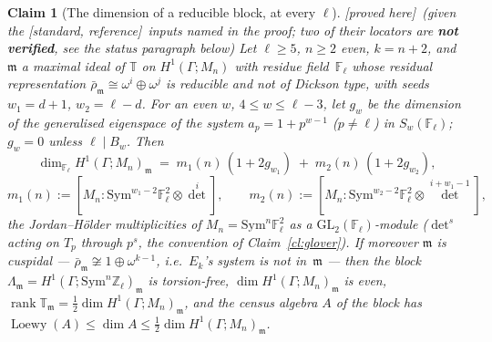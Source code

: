 \documentclass[11pt]{article}
\newtheorem{claim}[theorem]{Claim}
\theoremstyle{remark}
\newcommand{\F}{\mathbb{F}}
\newcommand{\Z}{\mathbb{Z}}
\newcommand{\GL}{\mathrm{GL}}
\newcommand{\Sym}{\mathrm{Sym}}
\newcommand{\Ga}{\Gamma}
\newcommand{\Fl}{\F_\ell}
\DeclareMathOperator{\rank}{rank}
\newcommand{\T}{\mathbb{T}}
\newcommand{\m}{\mathfrak{m}}
\newcommand{\Mn}{M_n}
\newcommand{\PROVED}{\textsf{[proved here]}}
\newcommand{\STD}{\textsf{[standard, reference]}}
\begin{document}
\begin{claim}[The dimension of a reducible block, at every $\ell$]\label{cl:dimformula}\PROVED\ (given the \STD\ inputs named in the proof; two of their
locators are \textbf{not verified}, see the status paragraph below)
Let $\ell\ge5$, $n\ge2$ even, $k=n+2$, and $\m$ a maximal ideal of $\T$ on $H^1(\Ga;\Mn)$ with residue field~$\Fl$ whose residual representation
$\bar\rho_\m\cong\omega^{i}\oplus\omega^{j}$ is reducible and not of Dickson type, with seeds $w_1=d+1$, $w_2=\ell-d$. For an even $w$, $4\le w\le\ell-3$, let
$g_w$ be the dimension of the generalised eigenspace of the system $a_p=1+p^{w-1}$ ($p\ne\ell$) in $S_w(\Fl)$; $g_w=0$ unless $\ell\mid B_w$. Then
\[
  \dim_{\Fl}H^1(\Ga;\Mn)_\m\;=\;m_1(n)\,(1+2g_{w_1})\;+\;m_2(n)\,(1+2g_{w_2}),
\]
\[
  m_1(n):=[\Mn:\Sym^{w_1-2}\Fl^{2}\otimes{\det}^{i}],\qquad m_2(n):=[\Mn:\Sym^{w_2-2}\Fl^{2}\otimes{\det}^{i+w_1-1}],
\]
the Jordan--H\"older multiplicities of $\Mn=\Sym^{n}\Fl^{2}$ as a $\GL_2(\Fl)$-module (${\det}^{s}$ acting on $T_p$ through $p^{s}$, the convention of
Claim~\ref{cl:glover}). If moreover $\m$ is \emph{cuspidal} --- $\bar\rho_\m\not\cong1\oplus\omega^{k-1}$, i.e.\ $E_k$'s system is not in~$\m$ --- then the block
$\Lambda_\m=H^1(\Ga;\Sym^{n}\Z_\ell)_\m$ is torsion-free, $\dim H^1(\Ga;\Mn)_\m$ is even, $\rank\T_\m=\frac12\dim H^1(\Ga;\Mn)_\m$, and the census algebra
$A$ of the block has $\operatorname{Loewy}(A)\le\dim A\le\frac12\dim H^1(\Ga;\Mn)_\m$.
\end{claim}
\end{document}
